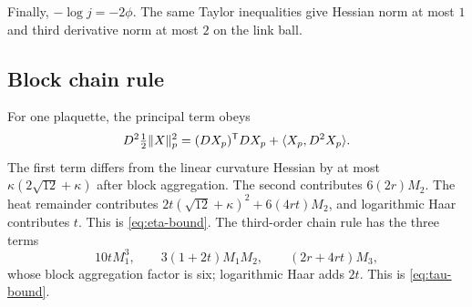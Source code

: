 Finally, $-\log j=-2\phi$.  The same Taylor inequalities give Hessian norm
at most $1$ and third derivative norm at most $2$ on the link ball.

\subsection{Block chain rule}

For one plaquette, the principal term obeys
\[
 D^2\tfrac12\lVert X\rVert_p^2=(DX_p)^{\mathsf T}DX_p+\langle X_p,D^2X_p\rangle.
\]
The first term differs from the linear curvature Hessian by at most
$\kappa(2\sqrt{12}+\kappa)$ after block aggregation.  The second contributes
$6(2r)M_2$.  The heat remainder contributes
$2t(\sqrt{12}+\kappa)^2+6(4rt)M_2$, and logarithmic Haar contributes $t$.
This is \eqref{eq:eta-bound}.  The third-order chain rule has the three terms
\[
 10tM_1^3,\qquad 3(1+2t)M_1M_2,\qquad (2r+4rt)M_3,
\]
whose block aggregation factor is six; logarithmic Haar adds $2t$.  This is
\eqref{eq:tau-bound}.
